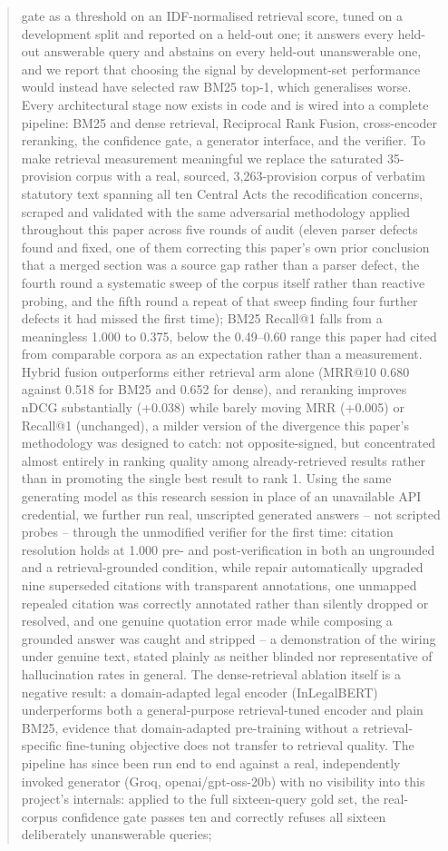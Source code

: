 \documentclass[conference]{IEEEtran}
\begin{document}
\begin{abstract}
gate as a threshold on an IDF-normalised retrieval score, tuned on a development split and reported on a held-out one; it answers every held-out answerable query and abstains on every held-out unanswerable one, and we report that choosing the signal by development-set performance would instead have selected raw BM25 top-1, which generalises worse. Every architectural stage now exists in code and is wired into a complete pipeline: BM25 and dense retrieval, Reciprocal Rank Fusion, cross-encoder reranking, the confidence gate, a generator interface, and the verifier. To make retrieval measurement meaningful we replace the saturated 35-provision corpus with a real, sourced, 3{,}263-provision corpus of verbatim statutory text spanning all ten Central Acts the recodification concerns, scraped and validated with the same adversarial methodology applied throughout this paper across five rounds of audit (eleven parser defects found and fixed, one of them correcting this paper's own prior conclusion that a merged section was a source gap rather than a parser defect, the fourth round a systematic sweep of the corpus itself rather than reactive probing, and the fifth round a repeat of that sweep finding four further defects it had missed the first time); BM25 Recall@1 falls from a meaningless 1.000 to 0.375, below the 0.49--0.60 range this paper had cited from comparable corpora as an expectation rather than a measurement. Hybrid fusion outperforms either retrieval arm alone (MRR@10 0.680 against 0.518 for BM25 and 0.652 for dense), and reranking improves nDCG substantially (+0.038) while barely moving MRR (+0.005) or Recall@1 (unchanged), a milder version of the divergence this paper's methodology was designed to catch: not opposite-signed, but concentrated almost entirely in ranking quality among already-retrieved results rather than in promoting the single best result to rank 1. Using the same generating model as this research session in place of an unavailable API credential, we further run real, unscripted generated answers -- not scripted probes -- through the unmodified verifier for the first time: citation resolution holds at 1.000 pre- and post-verification in both an ungrounded and a retrieval-grounded condition, while repair automatically upgraded nine superseded citations with transparent annotations, one unmapped repealed citation was correctly annotated rather than silently dropped or resolved, and one genuine quotation error made while composing a grounded answer was caught and stripped -- a demonstration of the wiring under genuine text, stated plainly as neither blinded nor representative of hallucination rates in general. The dense-retrieval ablation itself is a negative result: a domain-adapted legal encoder (InLegalBERT) underperforms both a general-purpose retrieval-tuned encoder and plain BM25, evidence that domain-adapted pre-training without a retrieval-specific fine-tuning objective does not transfer to retrieval quality. The pipeline has since been run end to end against a real, independently invoked generator (Groq, openai/gpt-oss-20b) with no visibility into this project's internals: applied to the full sixteen-query gold set, the real-corpus confidence gate passes ten and correctly refuses all sixteen deliberately unanswerable queries; 
\end{abstract}
\end{document}
